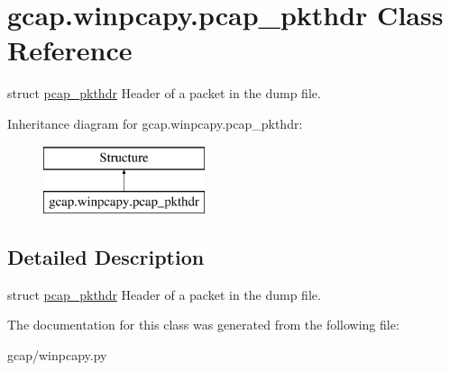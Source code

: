 \hypertarget{classgcap_1_1winpcapy_1_1pcap__pkthdr}{}\section{gcap.\+winpcapy.\+pcap\+\_\+pkthdr Class Reference}
\label{classgcap_1_1winpcapy_1_1pcap__pkthdr}


struct \hyperlink{classgcap_1_1winpcapy_1_1pcap__pkthdr}{pcap\+\_\+pkthdr} Header of a packet in the dump file.  


Inheritance diagram for gcap.\+winpcapy.\+pcap\+\_\+pkthdr\+:\begin{figure}[H]
\begin{center}
\leavevmode
\includegraphics[height=2.000000cm]{dd/d22/classgcap_1_1winpcapy_1_1pcap__pkthdr}
\end{center}
\end{figure}


\subsection{Detailed Description}
struct \hyperlink{classgcap_1_1winpcapy_1_1pcap__pkthdr}{pcap\+\_\+pkthdr} Header of a packet in the dump file. 



The documentation for this class was generated from the following file\+:\begin{DoxyCompactItemize}
\item 
gcap/winpcapy.\+py\end{DoxyCompactItemize}
